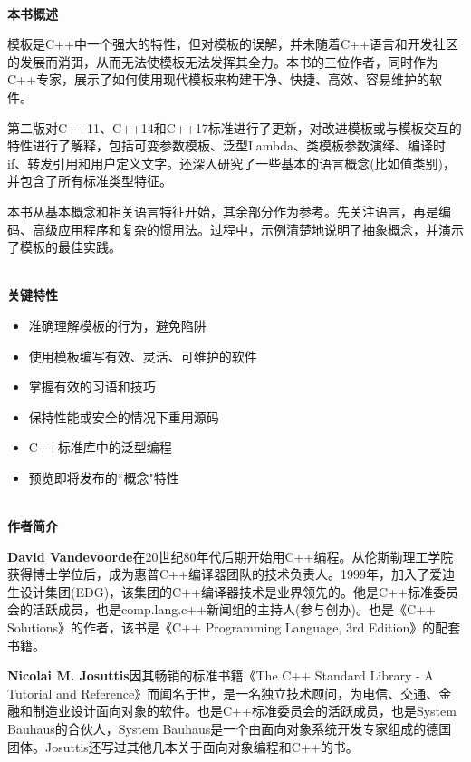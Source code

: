 \documentclass[11pt,a4paper,UTF8]{book}
\begin{document}
\begin{sloppypar}
	\hspace*{\fill} \\ %
	\noindent\textbf{本书概述}
	
	模板是C++中一个强大的特性，但对模板的误解，并未随着C++语言和开发社区的发展而消弭，从而无法使模板无法发挥其全力。本书的三位作者，同时作为C++专家，展示了如何使用现代模板来构建干净、快捷、高效、容易维护的软件。
	
	第二版对C++11、C++14和C++17标准进行了更新，对改进模板或与模板交互的特性进行了解释，包括可变参数模板、泛型Lambda、类模板参数演绎、编译时if、转发引用和用户定义文字。还深入研究了一些基本的语言概念(比如值类别)，并包含了所有标准类型特征。
	
	本书从基本概念和相关语言特征开始，其余部分作为参考。先关注语言，再是编码、高级应用程序和复杂的惯用法。过程中，示例清楚地说明了抽象概念，并演示了模板的最佳实践。
	
	\hspace*{\fill} \\ %
	\noindent\textbf{关键特性}
	\begin{itemize}
		\item 准确理解模板的行为，避免陷阱
		\item 使用模板编写有效、灵活、可维护的软件
		\item 掌握有效的习语和技巧
		\item 保持性能或安全的情况下重用源码
		\item C++标准库中的泛型编程
		\item 预览即将发布的“概念"特性
	\end{itemize}
	
	\hspace*{\fill} \\ %
	\noindent\textbf{作者简介}
	
	\textbf{David Vandevoorde}在20世纪80年代后期开始用C++编程。从伦斯勒理工学院获得博士学位后，成为惠普C++编译器团队的技术负责人。1999年，加入了爱迪生设计集团(EDG)，该集团的C++编译器技术是业界领先的。他是C++标准委员会的活跃成员，也是comp.lang.c++新闻组的主持人(参与创办)。也是《C++ Solutions》的作者，该书是《C++ Programming Language, 3rd Edition》的配套书籍。
	
	\textbf{Nicolai M. Josuttis}因其畅销的标准书籍《The C++ Standard Library - A Tutorial and Reference》而闻名于世，是一名独立技术顾问，为电信、交通、金融和制造业设计面向对象的软件。也是C++标准委员会的活跃成员，也是System Bauhaus的合伙人，System Bauhaus是一个由面向对象系统开发专家组成的德国团体。Josuttis还写过其他几本关于面向对象编程和C++的书。
	

\end{sloppypar}
\end{document}
